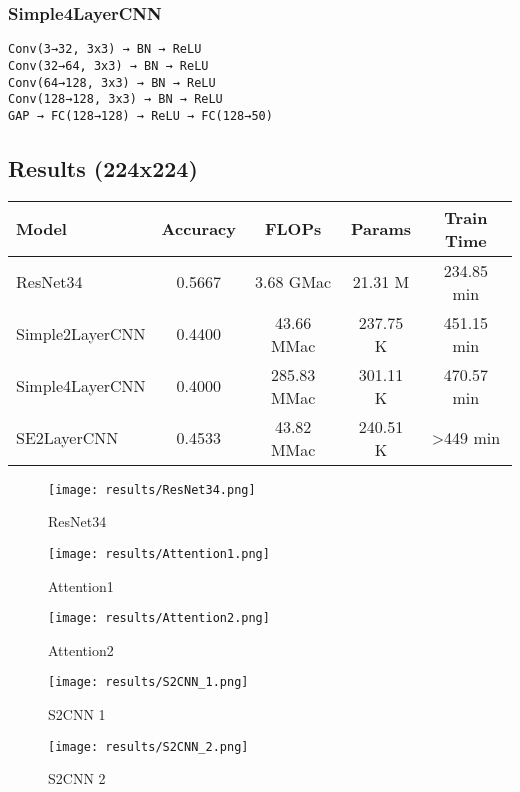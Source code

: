 \documentclass[12pt]{article}
\begin{document}
\subsubsection*{Simple4LayerCNN}
\begin{Verbatim}
Conv(3→32, 3x3) → BN → ReLU
Conv(32→64, 3x3) → BN → ReLU
Conv(64→128, 3x3) → BN → ReLU
Conv(128→128, 3x3) → BN → ReLU
GAP → FC(128→128) → ReLU → FC(128→50)
\end{Verbatim}

\subsection*{Results (224x224)}

\begin{center}
\begin{tabular}{lcccc}
\toprule
Model & Accuracy & FLOPs & Params & Train Time \\
\midrule
ResNet34 & 0.5667 & 3.68 GMac & 21.31 M & 234.85 min \\
Simple2LayerCNN & 0.4400 & 43.66 MMac & 237.75 K & 451.15 min \\
Simple4LayerCNN & 0.4000 & 285.83 MMac & 301.11 K & 470.57 min \\
SE2LayerCNN & 0.4533 & 43.82 MMac & 240.51 K & >449 min \\
\bottomrule
\end{tabular}
\end{center}





\begin{figure}[H]
\centering
\texttt{[image: results/ResNet34.png]}
\caption{ResNet34}
\end{figure}

\begin{figure}[H]
\centering
\texttt{[image: results/Attention1.png]}
\caption{Attention1}
\end{figure}


\begin{figure}[H]
\centering
\texttt{[image: results/Attention2.png]}
\caption{Attention2}
\end{figure}

\begin{figure}[H]
\centering
\texttt{[image: results/S2CNN\_1.png]}
\caption{S2CNN 1}
\end{figure}


\begin{figure}[H]
\centering
\texttt{[image: results/S2CNN\_2.png]}
\caption{S2CNN 2}
\end{figure}
\end{document}
